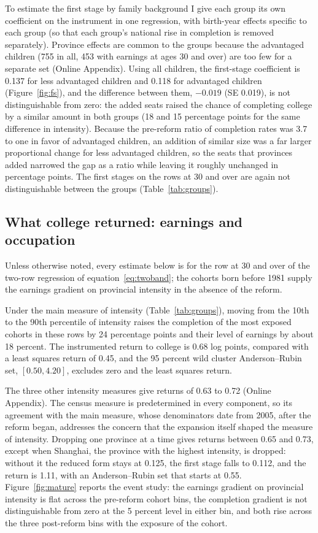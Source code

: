 \documentclass[11pt]{article}
\begin{document}
To estimate the first stage by family background I give each group its own coefficient on the instrument in one regression, with birth-year effects specific to each group (so that each group's national rise in completion is removed separately). Province effects are common to the groups because the advantaged children (755 in all, 453 with earnings at ages 30 and over) are too few for a separate set (Online Appendix). Using all children, the first-stage coefficient is 0.137 for less advantaged children and 0.118 for advantaged children (Figure~\ref{fig:fs}), and the difference between them, $-0.019$ (SE 0.019), is not distinguishable from zero: the added seats raised the chance of completing college by a similar amount in both groups (18 and 15 percentage points for the same difference in intensity). Because the pre-reform ratio of completion rates was 3.7 to one in favor of advantaged children, an addition of similar size was a far larger proportional change for less advantaged children, so the seats that provinces added narrowed the gap as a ratio while leaving it roughly unchanged in percentage points. The first stages on the rows at 30 and over are again not distinguishable between the groups (Table~\ref{tab:groups}).



\subsection{What college returned: earnings and occupation}
\label{sec:earnings}

Unless otherwise noted, every estimate below is for the row at 30 and over of the two-row regression of equation~\eqref{eq:twoband}; the cohorts born before 1981 supply the earnings
gradient on provincial intensity in the absence of the reform.

Under the main measure of intensity (Table~\ref{tab:groups}), moving from the 10th to the 90th percentile of intensity raises the completion of the most exposed cohorts in these rows by 24 percentage points and their level of earnings by about 18 percent. The instrumented return to college is 0.68 log points, compared with a least squares return of 0.45, and the 95 percent wild cluster Anderson--Rubin set, $[0.50, 4.20]$, excludes zero and the least squares return.

The three other intensity measures give returns of 0.63 to 0.72 (Online Appendix). The census measure is predetermined in every component, so its agreement with the main measure, whose denominators date from 2005, after the reform began, addresses the concern that the expansion itself shaped the measure of intensity. Dropping one province at a time gives returns between 0.65 and 0.73, except when Shanghai, the province with the highest intensity, is dropped: without it the reduced form stays at 0.125, the first stage falls to 0.112, and the return is 1.11, with an Anderson--Rubin set that starts at 0.55. Figure~\ref{fig:mature} reports the event study: the earnings gradient on provincial intensity is flat across the pre-reform cohort bins, the completion gradient is not distinguishable from zero at the 5 percent level in either bin, and both rise across the three post-reform bins with the exposure of the cohort.
\end{document}
